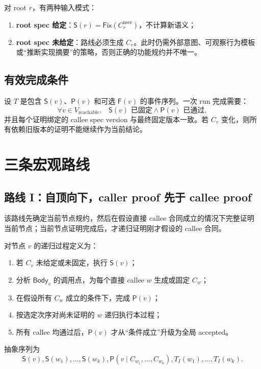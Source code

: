 \documentclass[UTF8,a4paper,11pt]{ctexart}
\newcommand{\SpecOp}{\mathsf{S}}
\newcommand{\ProofOp}{\mathsf{P}}
\newcommand{\FindBug}{\mathsf{F}}
\newcommand{\Body}{\mathsf{Body}}
\newcommand{\Fix}{\mathsf{Fix}}
\begin{document}
对 root $r$，有两种输入模式：
\begin{enumerate}[label=(\alph*)]
  \item \textbf{root spec 给定}：$\SpecOp(r)=\Fix(C_r^{\mathrm{user}})$，不计算新语义；
  \item \textbf{root spec 未给定}：路线必须生成 $C_r$。此时仍需外部意图、可观察行为模板或“推断实现摘要”的策略，否则正确的功能规约并不唯一。
\end{enumerate}

\subsection{有效完成条件}

设 $T$ 是包含 $\SpecOp(v)$、$\ProofOp(v)$ 和可选 $\FindBug(v)$ 的事件序列。一次 run 完成需要：
\[
  \forall v\in V_{\mathrm{reachable}}.\quad
  \SpecOp(v)\text{ 已固定}\land \ProofOp(v)\text{ 已通过},
\]
并且每个证明绑定的 callee spec version 与最终固定版本一致。若 $C_v$ 变化，则所有依赖旧版本的证明不能继续作为当前结论。

\section{三条宏观路线}

\subsection{路线 I：自顶向下，caller proof 先于 callee proof}

该路线先确定当前节点规约，然后在假设直接 callee 合同成立的情况下完整证明当前节点；当前节点证明完成后，才递归证明刚才假设的 callee 合同。

对节点 $v$ 的递归过程定义为：
\begin{enumerate}[label=I\arabic*.]
  \item 若 $C_v$ 未给定或未固定，执行 $\SpecOp(v)$；
  \item 分析 $\Body_v$ 的调用点，为每个直接 callee $w$ 生成或固定 $C_w$；
  \item 在假设所有 $C_w$ 成立的条件下，完成 $\ProofOp(v)$；
  \item 按选定次序对尚未证明的 $w$ 递归执行本过程；
  \item 所有 callee 均通过后，$\ProofOp(v)$ 才从“条件成立”升级为全局 accepted。
\end{enumerate}

抽象序列为
\[
  \SpecOp(v),
  \SpecOp(w_1),\ldots,\SpecOp(w_k),
  \ProofOp(v\mid C_{w_1},\ldots,C_{w_k}),
  T_I(w_1),\ldots,T_I(w_k).
\]
\end{document}
